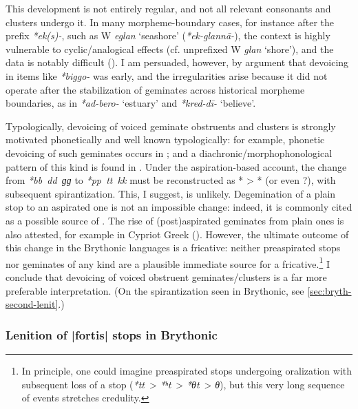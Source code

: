 \documentclass[output=paper,colorlinks,citecolor=brown]{langscibook}
\begin{document}
This development is not entirely regular, and not all relevant consonants and clusters undergo it. In many morpheme\hyp boundary cases, for instance after the prefix \textit{*ek(s)-}, such as W \textit{eglan} `seashore' (\textit{*ek-glannā-}), the context is highly vulnerable to cyclic\fshyp analogical effects (cf. unprefixed W \textit{glan} `shore'), and the data is notably difficult (\cite{russell1988celtic,stifter2023celtic}). I am persuaded, however, by  argument that devoicing in items like \textit{*biggo-} was early, and the irregularities arise because it did not operate after the stabilization of  geminates across historical morpheme boundaries, as in \textit{*ad-bero-} `estuary' and \textit{*kred-dī-} `believe'.

Typologically, devoicing of voiced geminate obstruents and clusters is strongly motivated phonetically \parencite{ohala1997aerodynamics} and well known typologically: for example, phonetic devoicing of such geminates occurs in  \parencite{hirose07}; and a diachronic\fshyp morphophonological pattern of this kind is found in  \parencite[ch.~2]{petros2000sound}. Under the aspiration\hyp based account, the change from \textit{*bb~dd~ɡɡ} to \textit{*pp~tt~kk} must be reconstructed as *\ipa{[tt]} > *\ipa{[tʰ]} (or even \ipa{[ttʰ]}?), with subsequent spirantization. This, I suggest, is unlikely. Degemination of a plain stop to an aspirated one is not an impossible change: indeed, it is commonly cited as a possible source of  \parencite{blevins1993ponapeic}. The rise of (post)aspirated geminates from plain ones is also attested, for example in Cypriot Greek (\cite{newton1972cypriot,armostis2009cypriot}). However, the ultimate outcome of this change in the Brythonic languages is a fricative: neither preaspirated stops nor geminates of any kind are a plausible immediate source for a fricative.\footnote{In principle, one could imagine preaspirated stops undergoing  oralization \parencite[e.\,g.][]{silverman03} with subsequent loss of a stop (\textit{*tt}~> \textit{*ʰt}~> \textit{*θt}~> \textit{θ}), but this very long sequence of events stretches credulity.} I conclude that devoicing of voiced obstruent geminates\fshyp clusters is a far more preferable interpretation. (On the spirantization seen in Brythonic, see \cref{sec:bryth-second-lenit}.)

\subsubsection{Lenition of |fortis| stops in Brythonic}
\label{sec:lenit-fort-stops}
\end{document}
